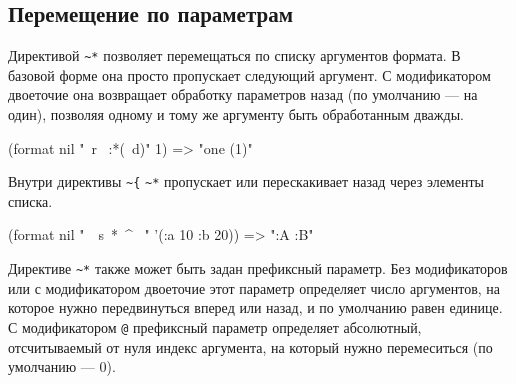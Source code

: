 \subsection{Перемещение по параметрам}
Директивой \lstinline{~*} позволяет перемещаться по списку аргументов формата. В базовой форме она просто пропускает следующий аргумент. С модификатором двоеточие она возвращает обработку параметров назад (по умолчанию — на один), позволяя одному и тому же аргументу быть обработанным дважды.
\begin{cllst}{}{}
(format nil "~r ~:*(~d)" 1) => "one (1)"
\end{cllst}

Внутри директивы \lstinline{~{} \lstinline{~*} пропускает или перескакивает назад через элементы списка.
\begin{cllst}{}{}
(format nil "~{~s~*~^ ~}" '(:a 10 :b 20)) => ":A :B"
\end{cllst}

Директиве \lstinline{~*} также может быть задан префиксный параметр. Без модификаторов или с модификатором двоеточие этот параметр определяет число аргументов, на которое нужно передвинуться вперед или назад, и по умолчанию равен единице. С модификатором \lstinline{@} префиксный параметр определяет абсолютный, отсчитываемый от нуля индекс аргумента, на который нужно перемеситься (по умолчанию — $0$).
